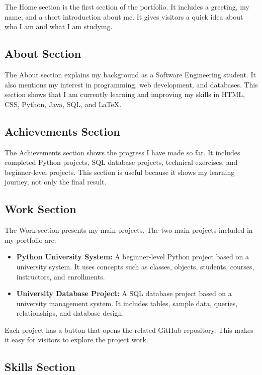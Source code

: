 \documentclass[12pt,a4paper]{article}
\begin{document}
The Home section is the first section of the portfolio. It includes a greeting, my name, and a short introduction about me. It gives visitors a quick idea about who I am and what I am studying.

\subsection{About Section}

The About section explains my background as a Software Engineering student. It also mentions my interest in programming, web development, and databases.
This section shows that I am currently learning and improving my skills in HTML, CSS, Python, Java, SQL, and LaTeX.

\subsection{Achievements Section}

The Achievements section shows the progress I have made so far. It includes completed Python projects, SQL database projects, technical exercises, and beginner-level projects.
This section is useful because it shows my learning journey, not only the final result.

\subsection{Work Section}

The Work section presents my main projects. The two main projects included in my portfolio are:

\begin{itemize}
\item \textbf{Python University System:} A beginner-level Python project based on a university system. It uses concepts such as classes, objects, students, courses, instructors, and enrollments.


\item \textbf{University Database Project:} A SQL database project based on a university management system. It includes tables, sample data, queries, relationships, and database design.


\end{itemize}

Each project has a button that opens the related GitHub repository. This makes it easy for visitors to explore the project work.

\subsection{Skills Section}
\end{document}
